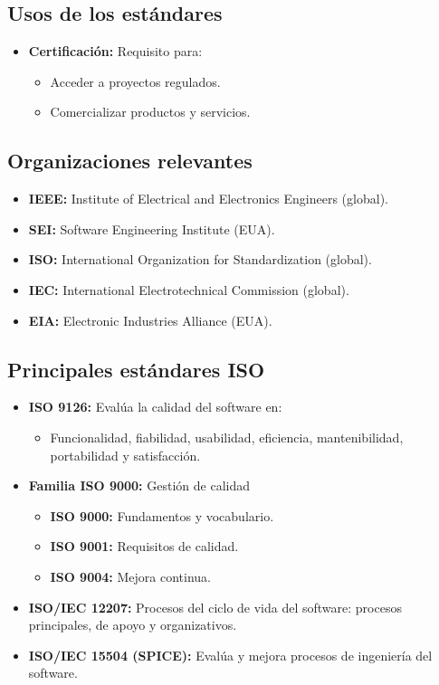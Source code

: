 \subsection{Usos de los estándares}
\begin{itemize}
    \item \textbf{Certificación:} Requisito para:
    \begin{itemize}
        \item Acceder a proyectos regulados.
        \item Comercializar productos y servicios.
    \end{itemize}
\end{itemize}

\subsection{Organizaciones relevantes}
\begin{itemize}
    \item \textbf{IEEE:} Institute of Electrical and Electronics Engineers (global).
    \item \textbf{SEI:} Software Engineering Institute (EUA).
    \item \textbf{ISO:} International Organization for Standardization (global).
    \item \textbf{IEC:} International Electrotechnical Commission (global).
    \item \textbf{EIA:} Electronic Industries Alliance (EUA).
\end{itemize}

\subsection{Principales estándares ISO}

\begin{itemize}
    \item \textbf{ISO 9126:} Evalúa la calidad del software en:
    \begin{itemize}
        \item Funcionalidad, fiabilidad, usabilidad, eficiencia, mantenibilidad, portabilidad y satisfacción.
    \end{itemize}
    \item \textbf{Familia ISO 9000:} Gestión de calidad
    \begin{itemize}
        \item \textbf{ISO 9000:} Fundamentos y vocabulario.
        \item \textbf{ISO 9001:} Requisitos de calidad.
        \item \textbf{ISO 9004:} Mejora continua.
    \end{itemize}

    \item \textbf{ISO/IEC 12207:} Procesos del ciclo de vida del software: procesos principales, de apoyo y organizativos.

    \item \textbf{ISO/IEC 15504 (SPICE):} Evalúa y mejora procesos de ingeniería del software.
\end{itemize}

